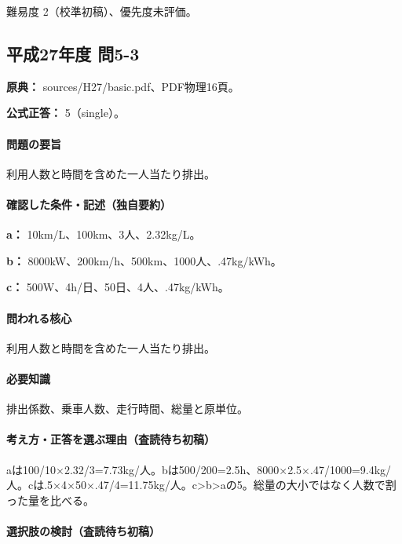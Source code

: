 \par 難易度 2（校準初稿）、優先度未評価。

\subsection{平成27年度 問5-3}
\label{q:h27-reg-basic-5-3}

\noindent\textbf{原典：} sources/H27/basic.pdf、PDF物理16頁。

\textbf{公式正答：} 5（single）。

\paragraph{問題の要旨} 利用人数と時間を含めた一人当たり排出。

\paragraph{確認した条件・記述（独自要約）}\mbox{}\par

\noindent\textbf{a：} 10km/L、100km、3人、2.32kg/L。\par

\noindent\textbf{b：} 8000kW、200km/h、500km、1000人、.47kg/kWh。\par

\noindent\textbf{c：} 500W、4h/日、50日、4人、.47kg/kWh。\par

\paragraph{問われる核心} 利用人数と時間を含めた一人当たり排出。

\paragraph{必要知識} 排出係数、乗車人数、走行時間、総量と原単位。

\paragraph{考え方・正答を選ぶ理由（査読待ち初稿）} aは100/10×2.32/3=\allowbreak{}7.73kg/人。bは500/200=\allowbreak{}2.5h、8000×2.5×.47/1000=\allowbreak{}9.4kg/人。cは.5×4×50×.47/4=\allowbreak{}11.75kg/人。c>b>aの5。総量の大小ではなく人数で割った量を比べる。

\paragraph{選択肢の検討（査読待ち初稿）}\mbox{}\par

